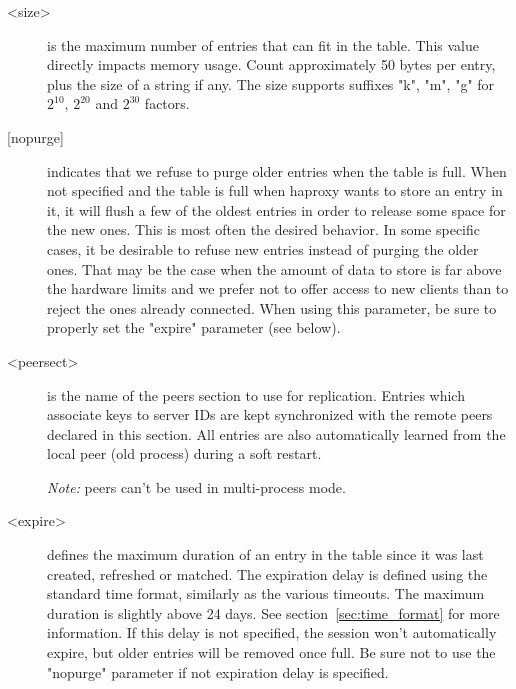 {\begin{description}
  \item[<size>] is the maximum number of entries that can fit in the table. This
               value directly impacts memory usage. Count approximately
               50 bytes per entry, plus the size of a string if any. The size
               supports suffixes "k", "m", "g" for $2^{10}$, $2^{20}$ and $2^{30}$ factors.

  \item[{[nopurge]}] indicates that we refuse to purge older entries when the table
               is full. When not specified and the table is full when haproxy
               wants to store an entry in it, it will flush a few of the oldest
               entries in order to release some space for the new ones. This is
               most often the desired behavior. In some specific cases, it
               be desirable to refuse new entries instead of purging the older
               ones. That may be the case when the amount of data to store is
               far above the hardware limits and we prefer not to offer access
               to new clients than to reject the ones already connected. When
               using this parameter, be sure to properly set the "expire"
               parameter (see below).

  \item[<peersect>] is the name of the peers section to use for replication. Entries
               which associate keys to server IDs are kept synchronized with
               the remote peers declared in this section. All entries are also
               automatically learned from the local peer (old process) during a
               soft restart.

               \emph{Note:} peers can't be used in multi-process mode.

  \item[<expire>] defines the maximum duration of an entry in the table since it
               was last created, refreshed or matched. The expiration delay is
               defined using the standard time format, similarly as the various
               timeouts. The maximum duration is slightly above 24 days. See
               section~\ref{sec:time_format} for more information. If this delay is not specified,
               the session won't automatically expire, but older entries will
               be removed once full. Be sure not to use the "nopurge" parameter
               if not expiration delay is specified.


\end{description}}
